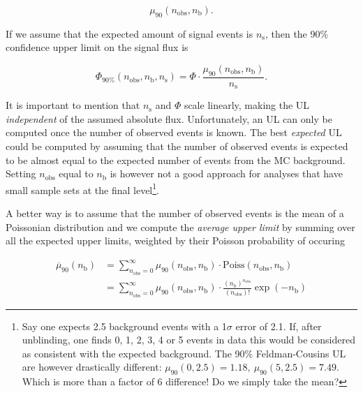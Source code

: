 \begin{equation}
\mu_{90} \left(n_\textrm{obs},n_\textrm{b}\right).
\end{equation}

\noindent If we assume that the expected amount of signal events is $n_\textrm{s}$, then the 90\% confidence upper limit on the signal flux is

\begin{equation}
\label{eq:flux}
\Phi_{90\%}\left(n_\textrm{obs},n_\textrm{b},n_\textrm{s}\right) = \Phi \cdot  \frac{\mu_{90}\left(n_\textrm{obs},n_\textrm{b}\right)}{n_\textrm{s}}.
\end{equation}

\noindent It is important to mention that $n_\textrm{s}$ and $\Phi$ scale linearly, making the UL \textit{independent} of the assumed absolute flux. Unfortunately, an UL can only be computed once the number of observed events is known. The best \textit{expected} UL could be computed by assuming that the number of observed events is expected to be almost equal to the expected number of events from the MC background. Setting $n_\textrm{obs}$ equal to $n_\textrm{b}$ is however not a good approach for analyses that have small sample sets at the final level\footnote{Say one expects 2.5 background events with a 1$\sigma$ error of 2.1. If, after unblinding, one finds 0, 1, 2, 3, 4 or 5 events in data this would be considered as consistent with the expected background. The 90\% Feldman-Cousins UL are however drastically different: $\mu_{90}(0,2.5) = 1.18, \ \mu_{90}(5,2.5) = 7.49$. Which is more than a factor of 6 difference! Do we simply take the mean?}.

A better way is to assume that the number of observed events is the mean of a Poissonian distribution and we compute the \textit{average upper limit} by summing over all the expected upper limits, weighted by their Poisson probability of occuring \cite{Hill:2002nv}

\begin{equation}
\begin{split}
\overline{\mu}_{90}(n_\textrm{b}) &= \sum^{\infty}_{n_\textrm{obs}=0} \mu_{90}\left(n_\textrm{obs},n_\textrm{b}\right) \cdot \textrm{Poiss}\left(n_\textrm{obs},n_\textrm{b}\right)\\
&= \sum^{\infty}_{n_\textrm{obs}=0} \mu_{90}\left(n_\textrm{obs},n_\textrm{b}\right) \cdot \frac{\left(n_\textrm{b}\right)^{n_\textrm{obs}}}{\left(n_\textrm{obs}\right)!} \exp\left(-n_\textrm{b}\right)
\end{split}
\end{equation}

